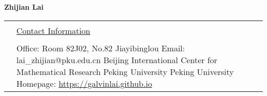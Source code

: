 \documentclass[a4paper,10pt]{article}
\newcommand{\headingfont}{\LARGE \MakeUppercase }
\newenvironment{SectionTable}[1]{
	\renewcommand*{\arraystretch}{1.0}
	\setlength{\tabcolsep}{10pt}
	\begin{longtable}{Rp{5.2in}} 
		\rule{2.3cm}{4pt} 
		& \underline{#1} \\ %
	}
	{
	\end{longtable}\vspace{-.3cm}
}
\begin{document}
	

\thispagestyle{plain}  %


\begin{center}
	{\Huge \bf Zhijian Lai} 
\end{center}
\begin{SectionTable}{\headingfont Contact Information} 
	&
	Office: Room 82J02, No.82 Jiayibinglou  \hfill Email: lai\_zhijian@pku.edu.cn  \newline 
	Beijing International Center for Mathematical Research Peking University  \newline
	Peking University \hfill Homepage: \href{https://galvinlai.github.io}{https://galvinlai.github.io} 
\end{SectionTable}




\end{document}
